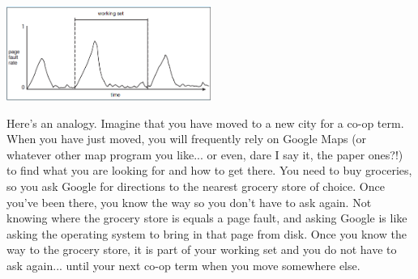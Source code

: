 \begin{center}
	\includegraphics[width=0.5\textwidth]{images/workingset.png}
\end{center}

Here's an analogy. Imagine that you have moved to a new city for a co-op term. When you have just moved, you will frequently rely on Google Maps (or whatever other map program you like... or even, dare I say it, the paper ones?!) to find what you are looking for and how to get there. You need to buy groceries, so you ask Google for directions to the nearest grocery store of choice. Once you've been there, you know the way so you don't have to ask again. Not knowing where the grocery store is equals a page fault, and asking Google is like asking the operating system to bring in that page from disk. Once you know the way to the grocery store, it is part of your working set and you do not have to ask again... until your next co-op term when you move somewhere else.




